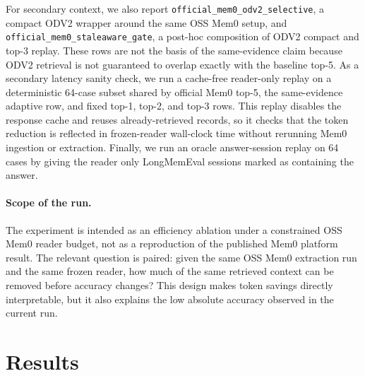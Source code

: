 \documentclass{article}
\begin{document}
For secondary context, we also report \texttt{official\_mem0\_odv2\_selective}, a compact ODV2 wrapper around the same OSS Mem0 setup, and \texttt{official\_mem0\_staleaware\_gate}, a post-hoc composition of ODV2 compact and top-3 replay. These rows are not the basis of the same-evidence claim because ODV2 retrieval is not guaranteed to overlap exactly with the baseline top-5. As a secondary latency sanity check, we run a cache-free reader-only replay on a deterministic 64-case subset shared by official Mem0 top-5, the same-evidence adaptive row, and fixed top-1, top-2, and top-3 rows. This replay disables the response cache and reuses already-retrieved records, so it checks that the token reduction is reflected in frozen-reader wall-clock time without rerunning Mem0 ingestion or extraction. Finally, we run an oracle answer-session replay on 64 cases by giving the reader only LongMemEval sessions marked as containing the answer.

\paragraph{Scope of the run.}
The experiment is intended as an efficiency ablation under a constrained OSS Mem0 reader budget, not as a reproduction of the published Mem0 platform result. The relevant question is paired: given the same OSS Mem0 extraction run and the same frozen reader, how much of the same retrieved context can be removed before accuracy changes? This design makes token savings directly interpretable, but it also explains the low absolute accuracy observed in the current run.

\section{Results}
\end{document}
